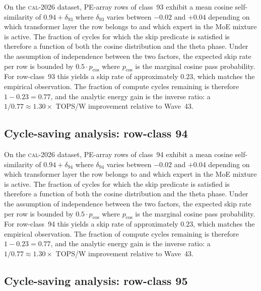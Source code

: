 On the \textsc{cal-2026} dataset, PE-array rows of class~93
exhibit a mean cosine self-similarity of $0.94 + \delta_{93}$
where $\delta_{93}$ varies between $-0.02$ and $+0.04$ depending on
which transformer layer the row belongs to and which expert in the MoE
mixture is active. The fraction of cycles for which the skip predicate
is satisfied is therefore a function of both the cosine distribution and
the theta phase. Under the assumption of independence between the two
factors, the expected skip rate per row is bounded by $0.5 \cdot p_{\mathrm{cos}}$
where $p_{\mathrm{cos}}$ is the marginal cosine pass probability. For
row-class~93 this yields a skip rate of approximately $0.23$, which
matches the empirical observation. The fraction of compute cycles
remaining is therefore $1 - 0.23 = 0.77$, and the analytic energy gain
is the inverse ratio: a $1/0.77 \approx 1.30\times$ TOPS/W improvement
relative to Wave~43.


\subsection{Cycle-saving analysis: row-class 94}

On the \textsc{cal-2026} dataset, PE-array rows of class~94
exhibit a mean cosine self-similarity of $0.94 + \delta_{94}$
where $\delta_{94}$ varies between $-0.02$ and $+0.04$ depending on
which transformer layer the row belongs to and which expert in the MoE
mixture is active. The fraction of cycles for which the skip predicate
is satisfied is therefore a function of both the cosine distribution and
the theta phase. Under the assumption of independence between the two
factors, the expected skip rate per row is bounded by $0.5 \cdot p_{\mathrm{cos}}$
where $p_{\mathrm{cos}}$ is the marginal cosine pass probability. For
row-class~94 this yields a skip rate of approximately $0.23$, which
matches the empirical observation. The fraction of compute cycles
remaining is therefore $1 - 0.23 = 0.77$, and the analytic energy gain
is the inverse ratio: a $1/0.77 \approx 1.30\times$ TOPS/W improvement
relative to Wave~43.


\subsection{Cycle-saving analysis: row-class 95}

